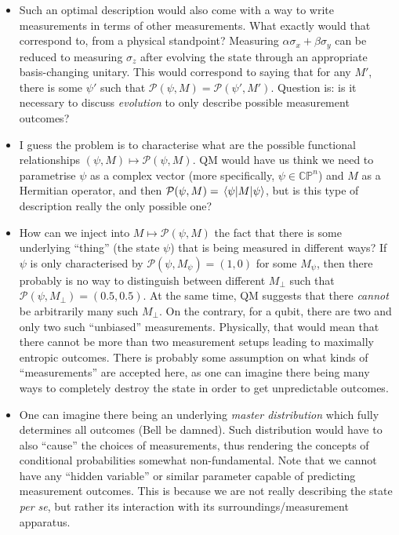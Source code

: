 \documentclass[12pt]{report}
\newcommand{\calP}{{\mathcal{P}}}
\begin{document}
\begin{itemize}
	\item Such an optimal description would also come with a way to write measurements in terms of other measurements. What exactly would that correspond to, from a physical standpoint? Measuring $\alpha\sigma_x+\beta\sigma_y$ can be reduced to measuring $\sigma_z$ after evolving the state through an appropriate basis-changing unitary.
	This would correspond to saying that for any $M'$, there is some $\psi'$ such that $\calP(\psi,M)=\calP(\psi',M')$.
	Question is: is it necessary to discuss \emph{evolution} to only describe possible measurement outcomes?
	\item I guess the problem is to characterise what are the possible functional relationships $(\psi,M)\mapsto \calP(\psi,M)$. QM would have us think we need to parametrise $\psi$ as a complex vector (more specifically, $\psi\in\mathbb{CP}^n$) and $M$ as a Hermitian operator, and then $\calP(\psi,M)=\mel{\psi}{M}{\psi}$, but is this type of description really the only possible one?
	\item How can we inject into $M\mapsto \calP(\psi,M)$ the fact that there is some underlying ``thing'' (the state $\psi$) that is being measured in different ways? If $\psi$ is only characterised by $\calP(\psi,M_\psi)=(1,0)$ for some $M_\psi$, then there probably is no way to distinguish between different $M_\perp$ such that $\calP(\psi,M_\perp)=(0.5,0.5)$.
	At the same time, QM suggests that there \emph{cannot} be arbitrarily many such $M_\perp$. On the contrary, for a qubit, there are two and only two such ``unbiased'' measurements.
	Physically, that would mean that there cannot be more than two measurement setups leading to maximally entropic outcomes.
	There is probably some assumption on what kinds of ``measurements'' are accepted here, as one can imagine there being many ways to completely destroy the state in order to get unpredictable outcomes.
	\item One can imagine there being an underlying \emph{master distribution} which fully determines all outcomes (Bell be damned).
	Such distribution would have to also ``cause'' the choices of measurements, thus rendering the concepts of conditional probabilities somewhat non-fundamental.
	Note that we cannot have any ``hidden variable'' or similar parameter capable of predicting measurement outcomes. This is because we are not really describing the state \emph{per se}, but rather its interaction with its surroundings/measurement apparatus.
\end{itemize}
\end{document}
